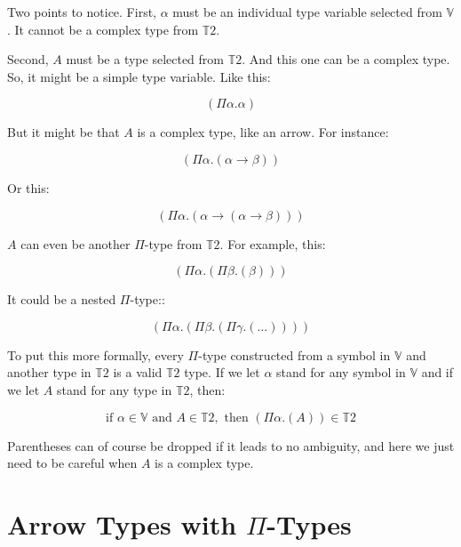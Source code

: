 \documentclass{book}
\numberwithin{equation}{chapter}
\begin{document}
\noindent
Two points to notice. First, $\alpha$ must be an individual type variable selected from $\mathbb{V}$. It cannot be a complex type from $\mathbb{T}2$.

Second, $A$ must be a type selected from $\mathbb{T}2$. And this one can be a complex type. So, it might be a simple type variable. Like this:

\begin{equation}
(\Pi \alpha.\alpha)
\end{equation}

\noindent
But it might be that $A$ is a complex type, like an arrow. For instance:

\begin{equation}
(\Pi \alpha.(\alpha \rightarrow \beta))
\end{equation}

\noindent
Or this:

\begin{equation}
(\Pi \alpha.(\alpha \rightarrow (\alpha \rightarrow \beta)))
\end{equation}

\noindent
$A$ can even be another $\Pi$-type from $\mathbb{T}2$. For example, this:

\begin{equation}
(\Pi \alpha.(\Pi \beta.(\beta)))
\end{equation}

\noindent
It could be a nested $\Pi$-type::

\begin{equation}
(\Pi \alpha.(\Pi \beta.(\Pi \gamma.(\ldots))))
\end{equation}

\noindent
To put this more formally, every $\Pi$-type constructed from a symbol in $\mathbb{V}$ and another type in $\mathbb{T}2$ is a valid $\mathbb{T}2$ type. If we let $\alpha$ stand for any symbol in $\mathbb{V}$ and if we let $A$ stand for any type in $\mathbb{T}2$, then:

\begin{equation}
\text{if } \alpha \in \mathbb{V} \text{ and } A \in \mathbb{T}2, \text{ then } (\Pi \alpha.(A)) \in \mathbb{T}2
\end{equation}

\noindent
Parentheses can of course be dropped if it leads to no ambiguity, and here we just need to be careful when $A$ is a complex type.


\section{Arrow Types with $\Pi$-Types}
\end{document}
